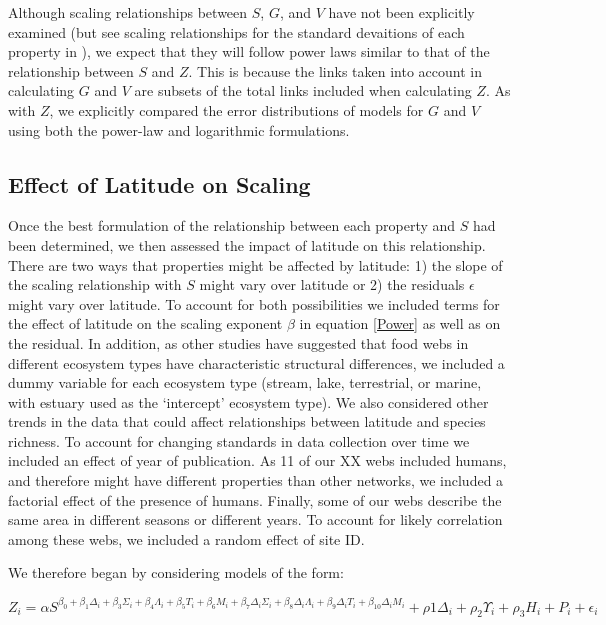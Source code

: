 \documentclass[12pt]{article}
\begin{document}
Although scaling relationships between $S$, $G$, and $V$ have not been explicitly examined (but see scaling 
relationships for the standard devaitions of each property in \citet{Riede2010}), we expect that they will follow
power laws similar to that of the relationship between $S$ and $Z$. This is because the links taken into account in
calculating $G$ and $V$ are subsets of the total links included when calculating $Z$. As with $Z$, we explicitly 
compared the error distributions of models for $G$ and $V$ using both the power-law and logarithmic formulations. 


\subsection*{Effect of Latitude on Scaling}



Once the best formulation of the relationship between each property and $S$ had been determined, we then assessed
the impact of latitude on this relationship. There are two ways that properties might be affected by latitude:
1) the slope of the scaling relationship with $S$ might vary over latitude or 2) the residuals $\epsilon$ might
vary over latitude. To account for both possibilities we included terms for the effect of latitude on the scaling
exponent $\beta$ in equation \ref{Power} as well as on the residual. In addition, as other studies have suggested that 
food webs in different ecosystem types have characteristic structural differences, we included a dummy variable for 
each ecosystem type (stream, lake, terrestrial, or marine, with estuary used as the `intercept' ecosystem type). 
We also considered other trends in the data that could affect relationships between latitude and species richness.
To account for changing standards in data collection over time \citep{Dunne2006} we included an effect of year of
publication. As 11 of our XX webs included humans, and therefore might have different properties than other networks,
we included a factorial effect of the presence of humans. Finally, some of our webs describe the same area in different
seasons or different years. To account for likely correlation among these webs, we included a random effect of site ID.


We therefore began by considering models of the form:

\begin{equation}
\label{PowerLat}

Z_{i}=\alpha S^{\beta_{0}+\beta_{1}\Delta_{i}+\beta_{3}\Sigma_{i} + \beta_{4}\Lambda_{i} + \beta_{5}T_{i} + \beta_{6}M_{i} 
+ \beta_{7}\Delta_{i}\Sigma_{i} + \beta_{8}\Delta_{i}\Lambda_{i} + \beta_{9}\Delta_{i}T_{i} + \beta_{10}\Delta_{i}M_{i}}
+ \rho{1}\Delta_{i} + \rho_{2}\Upsilon_{i} + \rho_{3}H_{i} + P_{i} + \epsilon_{i} 
\end{equation}
\end{document}
